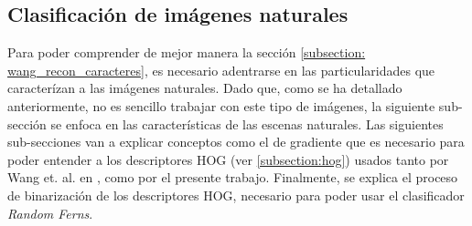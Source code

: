 \newpage
\subsection{Clasificación de imágenes naturales}

	Para poder comprender de mejor manera la sección \ref{subsection: wang_recon_caracteres}, es necesario adentrarse en las particularidades que caracterízan a las imágenes naturales. Dado que, como se ha detallado anteriormente, no es sencillo trabajar con este tipo de imágenes, la siguiente sub-sección se enfoca en las características de las escenas naturales. Las siguientes sub-secciones van a explicar conceptos como el de gradiente que es necesario para poder entender a los descriptores HOG (ver \ref{subsection:hog}) usados tanto por Wang et. al. en \cite{wang}, como por el presente trabajo. Finalmente, se explica el proceso de binarización de los descriptores HOG, necesario para poder usar el clasificador \textit{Random Ferns}.

	
	
	
	
